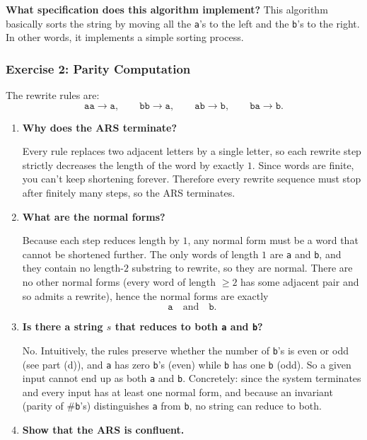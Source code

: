 \documentclass{article}
\theoremstyle{plain}
\theoremstyle{definition}
\theoremstyle{remark}
\begin{document}
\textbf{What specification does this algorithm implement?}
This algorithm basically sorts the string by moving all the \texttt{a}'s to the left and the \texttt{b}'s to the right. In other words, it implements a simple sorting process.

\subsubsection{Exercise 2: Parity Computation}

The rewrite rules are:
\[
\texttt{aa} \to \texttt{a},\qquad
\texttt{bb} \to \texttt{a},\qquad
\texttt{ab} \to \texttt{b},\qquad
\texttt{ba} \to \texttt{b}.
\]

\begin{enumerate}[label=(\alph*)]
  \item \textbf{Why does the ARS terminate?}
  
  Every rule replaces two adjacent letters by a single letter, so each rewrite step strictly decreases the length of the word by exactly $1$. Since words are finite, you can't keep shortening forever. Therefore every rewrite sequence must stop after finitely many steps, so the ARS terminates.
  
  \item \textbf{What are the normal forms?}
  
  Because each step reduces length by $1$, any normal form must be a word that cannot be shortened further. The only words of length $1$ are \texttt{a} and \texttt{b}, and they contain no length-$2$ substring to rewrite, so they are normal. There are no other normal forms (every word of length $\ge 2$ has some adjacent pair and so admits a rewrite), hence the normal forms are exactly
  \[
    \texttt{a}\quad\text{and}\quad\texttt{b}.
  \]
  
  \item \textbf{Is there a string \(s\) that reduces to both \texttt{a} and \texttt{b}?}
  
  No. Intuitively, the rules preserve whether the number of \texttt{b}'s is even or odd (see part (d)), and \texttt{a} has zero \texttt{b}'s (even) while \texttt{b} has one \texttt{b} (odd). So a given input cannot end up as both \texttt{a} and \texttt{b}. Concretely: since the system terminates and every input has at least one normal form, and because an invariant (parity of \#\texttt{b}'s) distinguishes \texttt{a} from \texttt{b}, no string can reduce to both.
  
  \item \textbf{Show that the ARS is confluent.}
  

\end{enumerate}
\end{document}
